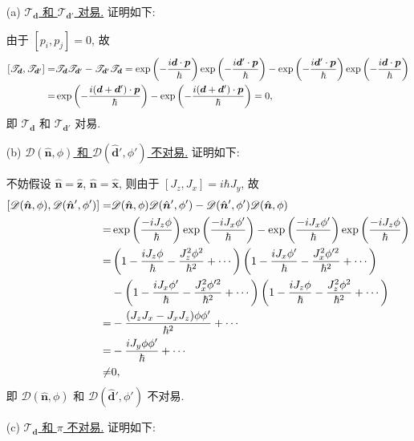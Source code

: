 \documentclass{assignment}
\begin{document}
\begin{sol}
    \begin{itemize}
        \item[(a)] \uline{$\mathscr{T}_{\bm{d}}$ 和 $\mathscr{T}_{\bm{d}'}$ 对易.} 证明如下:

        由于 $[p_i,p_j]=0$, 故
        \begin{align}
            \notag[\mathscr{T}_{\bm{d}},\mathscr{T}_{\bm{d}'}]=&\mathscr{T}_{\bm{d}}\mathscr{T}_{\bm{d}'}-\mathscr{T}_{\bm{d}'}\mathscr{T}_{\bm{d}}=\exp\left(-\frac{i\bm{d}\cdot\bm{p}}{\hbar}\right)\exp\left(-\frac{i\bm{d}'\cdot\bm{p}}{\hbar}\right)-\exp\left(-\frac{i\bm{d}'\cdot\bm{p}}{\hbar}\right)\exp\left(-\frac{i\bm{d}\cdot\bm{p}}{\hbar}\right)\\
            =&\exp\left(-\frac{i(\bm{d}+\bm{d}')\cdot\bm{p}}{\hbar}\right)-\exp\left(-\frac{i(\bm{d}+\bm{d}')\cdot\bm{p}}{\hbar}\right)=0,
        \end{align}
        即 $\mathscr{T}_{\bm{d}}$ 和 $\mathscr{T}_{\bm{d}'}$ 对易.
        \item[(b)] \uline{$\mathscr{D}(\hat{\bm{n}},\phi)$ 和 $\mathscr{D}(\hat{\bm{d}}',\phi')$ 不对易.} 证明如下:

        不妨假设 $\hat{\bm{n}}=\hat{\bm{z}}$, $\hat{\bm{n}}=\hat{\bm{x}}$, 则由于 $[J_z,J_x]=i\hbar J_y$, 故
        \begin{align}
            \notag[\mathscr{D}(\hat{\bm{n}},\phi),\mathscr{D}(\hat{\bm{n}}',\phi')]=&\mathscr{D}(\hat{\bm{n}},\phi)\mathscr{D}(\hat{\bm{n}}',\phi')-\mathscr{D}(\hat{\bm{n}}',\phi')\mathscr{D}(\hat{\bm{n}},\phi)\\
            \notag=&\exp\left(\frac{-iJ_z\phi}{\hbar}\right)\exp\left(\frac{-iJ_x\phi'}{\hbar}\right)-\exp\left(\frac{-iJ_x\phi'}{\hbar}\right)\exp\left(\frac{-iJ_z\phi}{\hbar}\right)\\
            \notag=&\left(1-\frac{iJ_z\phi}{\hbar}-\frac{J_z^2\phi^2}{\hbar^2}+\cdots\right)\left(1-\frac{iJ_x\phi'}{\hbar}-\frac{J_x^2\phi'^2}{\hbar^2}+\cdots\right)\\
            \notag&-\left(1-\frac{iJ_x\phi'}{\hbar}-\frac{J_x^2\phi'^2}{\hbar^2}+\cdots\right)\left(1-\frac{iJ_z\phi}{\hbar}-\frac{J_z^2\phi^2}{\hbar^2}+\cdots\right)\\
            \notag=&-\frac{(J_zJ_x-J_xJ_z)\phi\phi'}{\hbar^2}+\cdots\\
            \notag=&-\frac{iJ_y\phi\phi'}{\hbar}+\cdots\\
            \neq&0,
        \end{align}
        即 $\mathscr{D}(\hat{\bm{n}},\phi)$ 和 $\mathscr{D}(\hat{\bm{d}}',\phi')$ 不对易.
        \item[(c)] \uline{$\mathscr{T}_{\bm{d}}$ 和 $\pi$ 不对易.} 证明如下:


\end{itemize}
\end{sol}
\end{document}
